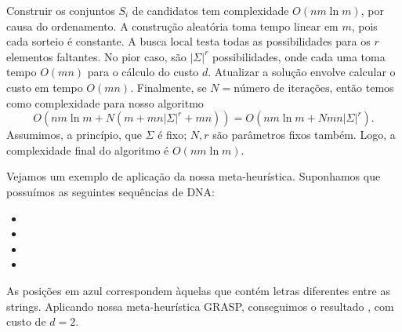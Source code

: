 Construir os conjuntos $S_i$ de candidatos tem complexidade $O(nm\ln m)$, por causa do ordenamento. A construção aleatória toma tempo linear em $m$, pois cada sorteio é constante. A busca local testa todas as possibilidades para os $r$ elementos faltantes. No pior caso, são $|\Sigma|^r$ possibilidades, onde cada uma toma tempo $O(mn)$ para o cálculo do custo $d$. Atualizar a solução envolve calcular o custo em tempo $O(mn)$. Finalmente, se $N = \text{número de iterações}$, então temos como complexidade para nosso algoritmo
\[O(nm\ln m + N(m + mn|\Sigma|^r + mn)) = O(nm\ln m + Nmn|\Sigma|^r).\]
Assumimos, a princípio, que $\Sigma$ é fixo; $N, r$ são parâmetros fixos também. Logo, a complexidade final do algoritmo é $O(nm\ln m)$.

Vejamos um exemplo de aplicação da nossa meta-heurística. Suponhamos que possuímos as seguintes sequências de DNA:
\begin{itemize}
    \item {}\fbox{\color{blue}{T}}\fbox{\color{blue}{A}}\fbox{\color{blue}{G}}\fbox{\color{blue}{T}}
    \item {}\fbox{\color{blue}{C}}\fbox{\color{blue}{T}}\fbox{\color{blue}{A}}\fbox{\color{blue}{C}}
    \item {}\fbox{\color{blue}{C}}\fbox{\color{blue}{A}}\fbox{\color{blue}{G}}\fbox{\color{blue}{T}}
    \item {}\fbox{\color{blue}{T}}\fbox{\color{blue}{A}}\fbox{\color{blue}{G}}\fbox{\color{blue}{T}}
\end{itemize}
As posições em azul correspondem àquelas que contém letras diferentes entre as strings. Aplicando nossa meta-heurística GRASP, conseguimos o resultado \fbox{\color{blue}{C}}\fbox{\color{blue}{A}}\fbox{\color{blue}{G}}\fbox{\color{blue}{C}}, com custo de $d=2$. 
